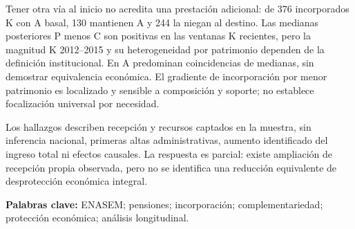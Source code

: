 \documentclass[12pt,letterpaper,oneside]{report}
\begin{document}
Tener otra vía al inicio no acredita una prestación adicional: de 376
incorporados K con A basal, 130 mantienen A y 244 la niegan al destino.
Las medianas posteriores P menos C son positivas en las ventanas K recientes,
pero la magnitud K 2012--2015 y su heterogeneidad por patrimonio dependen de
la definición institucional. En A predominan coincidencias de medianas,
sin demostrar equivalencia económica. El gradiente de incorporación por
menor patrimonio es localizado y sensible a composición y soporte; no
establece focalización universal por necesidad.

Los hallazgos describen recepción y recursos captados en la muestra, sin
inferencia nacional, primeras altas administrativas, aumento identificado
del ingreso total ni efectos causales. La respuesta es parcial: existe
ampliación de recepción propia observada, pero no se identifica una reducción
equivalente de desprotección económica integral.

\noindent\textbf{Palabras clave:} ENASEM; pensiones; incorporación;
complementariedad; protección económica; análisis longitudinal.

\clearpage
\begingroup\singlespacing\tableofcontents\endgroup
\listoftables
\listoffigures
\clearpage
{}








\appendix


\end{document}
